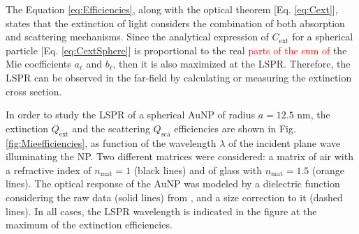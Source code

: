 The Equation \eqref{eq:Efficiencies}, along with the optical theorem [Eq. \eqref{eq:Cext}], states that the extinction of light considers  the combination of both absorption and scattering mechanisms. Since the analytical expression of $C_\text{ext}$ for a spherical particle [Eq. \eqref{eq:CextSphere}] is proportional to the real \textcolor{red}{parts of the sum of} the Mie coefficients $a_\ell$ and $b_\ell$, then it is also maximized at the LSPR. Therefore, the LSPR can be observed in the far-field by calculating or measuring the extinction cross section.

In order to study the LSPR of a spherical AuNP of radius $a = 12.5$ nm, the extinction  $Q_\text{ext}$ and the scattering  $Q_\text{sca}$ efficiencies are shown in Fig. \ref{fig:Mieefficiencies}, as function of the wavelength $\lambda$ of the incident plane wave illuminating the NP. Two different matrices were considered: a matrix of air with a refractive index of $n_\text{mat} = 1$ (black lines) and of glass with $n_\text{mat} = 1.5$ (orange lines). The optical response of the AuNP was modeled by a dielectric function considering the raw data (solid lines) from \citeauthor{johnson_optical_1972} \cite{johnson_optical_1972}, and a size correction to it (dashed lines). In all cases, the LSPR wavelength is indicated in the figure at the maximum of the extinction efficiencies.

